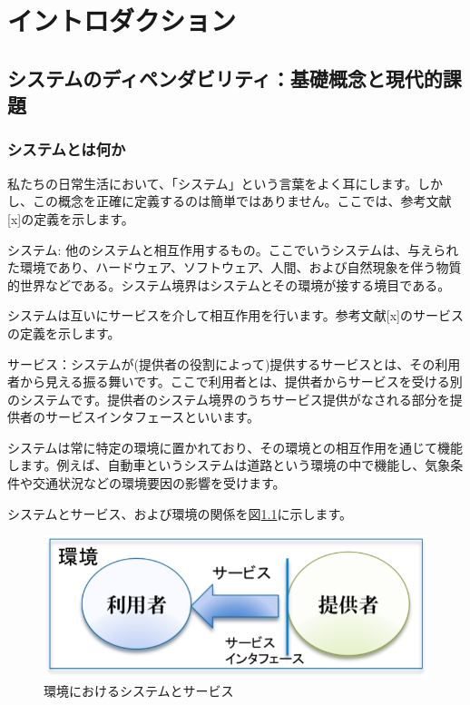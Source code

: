 \chapter{イントロダクション}
\label{chap1}

\section{システムのディペンダビリティ：基礎概念と現代的課題}

\subsection{システムとは何か}

私たちの日常生活において、「システム」という言葉をよく耳にします。しかし、この概念を正確に定義するのは簡単ではありません。ここでは、参考文献[x]の定義を示します。

システム: 他のシステムと相互作用するもの。ここでいうシステムは、与えられた環境であり、ハードウェア、ソフトウェア、人間、および自然現象を伴う物質的世界などである。システム境界はシステムとその環境が接する境目である。

システムは互いにサービスを介して相互作用を行います。参考文献[x]のサービスの定義を示します。

サービス：システムが(提供者の役割によって)提供するサービスとは、その利用者から見える振る舞いです。ここで利用者とは、提供者からサービスを受ける別のシステムです。提供者のシステム境界のうちサービス提供がなされる部分を提供者のサービスインタフェースといいます。

システムは常に特定の環境に置かれており、その環境との相互作用を通じて機能します。例えば、自動車というシステムは道路という環境の中で機能し、気象条件や交通状況などの環境要因の影響を受けます。

システムとサービス、および環境の関係を図\ref{fig:system1}に示します。
\begin{figure}[htbp]
\centering
\includegraphics[width=\textwidth]{safety_assurance_contents/ch1images/system_environment.pdf}
\caption{環境におけるシステムとサービス}
\label{fig:system1}
\end{figure}

